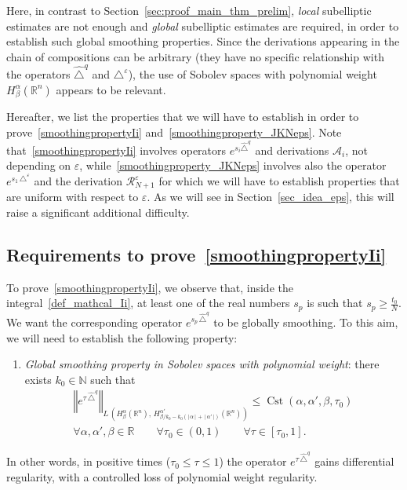 \documentclass[10pt]{amsart}
\theoremstyle{definition}\newtheorem{defi}[theo]{Definition}\newtheorem{rema}[theo]{Remark}\newtheorem{exam}[theo]{Example}\newtheorem{exem}[theo]{Example}\newtheorem{nota}[theo]{Notation}
\newcommand*\R{\mathbb{R}}
\newcommand*\N{\mathbb{N}}
\newcommand{\calA}{\mathcal{A}}
\newcommand{\calR}{\mathcal{R}}
\DeclareMathOperator{\Cst}{Cst}
\renewcommand{\geq}{\geqslant}
\renewcommand{\leq}{\leqslant}
\newcommand*{\Penumi}{\renewcommand*{\theenumi}{$\mathbf{P}_\arabic{enumi}$}}
\let\oldforall\forall
\renewcommand*{\forall}{\mathrel{\oldforall}}
\begin{document}
Here, in contrast to Section~\ref{sec:proof_main_thm_prelim}, \emph{local} subelliptic estimates are not enough and \emph{global} subelliptic estimates are required, in order to establish such global smoothing properties. Since the derivations appearing in the chain of compositions can be arbitrary (they have no specific relationship with the operators $\widehat{\triangle}^{q}$ and $\triangle^\varepsilon$), the use of Sobolev spaces with polynomial weight $H^\alpha_\beta(\R^n)$ appears to be relevant.

Hereafter, we list the properties that we will have to establish in order to prove~\eqref{smoothingpropertyIi} and~\eqref{smoothingproperty_JKNeps}. Note that~\eqref{smoothingpropertyIi} involves operators $e^{s_i \widehat{\triangle}^{q}}$ and derivations $\calA_i$, not depending on $\varepsilon$, while~\eqref{smoothingproperty_JKNeps} involves also the operator $e^{s_1\,\triangle^\varepsilon}$ and the derivation $\calR_{N+1}^\varepsilon$ for which we will have to establish properties that are uniform with respect to $\varepsilon$. As we will see in Section~\ref{sec_idea_eps}, this will raise a significant additional difficulty.

\subsection{Requirements to prove~\eqref{smoothingpropertyIi}}\label{sec_idea_nilp}
To prove~\eqref{smoothingpropertyIi}, we observe that, inside the integral~\eqref{def_mathcal_Ii}, at least one of the real numbers $s_p$ is such that $s_p\geq \frac{t_0}{N}$. We want the corresponding operator $e^{s_p\,\widehat{\triangle}^{q}}$ to be globally smoothing. To this aim, we will need to establish the following property:
\begin{enumerate}\Penumi
\item\label{Pglobsmoothing} \emph{Global smoothing property in Sobolev spaces with polynomial weight}: there exists $k_0\in\N$ such that
\begin{multline*}
\left\Vert e^{\tau\,\widehat{\triangle}^{q}}\right\Vert_{L\,\left(H^\alpha_\beta(\R^n),\,H^{\alpha'}_{\beta/k_0-k_0\left(\vert\,\alpha\,\vert\,+\,\vert\,\alpha'\,\vert\right)}(\R^n)\right)} \leq \Cst\left(\alpha,\alpha',\beta,\tau_0\right) \\
\forall \alpha,\alpha',\beta\in\R \qquad \forall \tau_0\in(0,1) \qquad \forall\tau\in[\tau_0,1].
\end{multline*}
\end{enumerate}
In other words, in positive times ($\tau_0\leq\tau\leq1$) the operator $e^{\tau\,\widehat{\triangle}^{q}}$ gains differential regularity, with a controlled loss of polynomial weight regularity.
\end{document}
